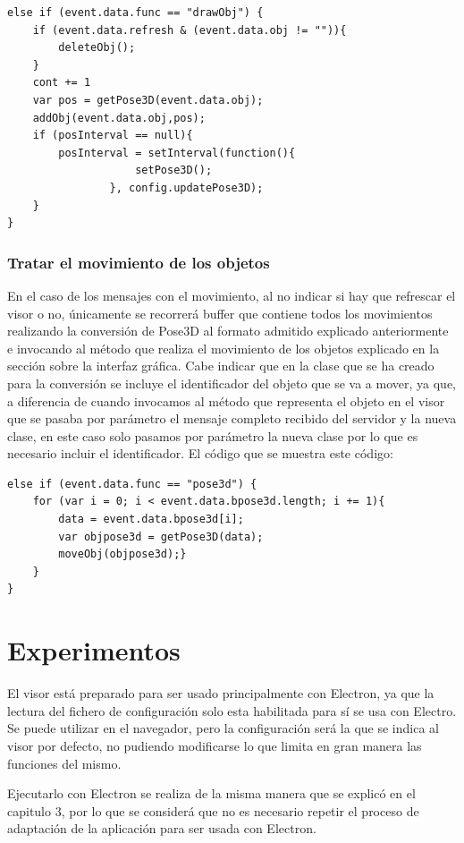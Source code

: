 \begin{lstlisting}[frame=single]
else if (event.data.func == "drawObj") {
	if (event.data.refresh & (event.data.obj != "")){
		deleteObj();
	}
	cont += 1
	var pos = getPose3D(event.data.obj);
	addObj(event.data.obj,pos);
	if (posInterval == null){ 
		posInterval = setInterval(function(){
					setPose3D();
				}, config.updatePose3D);
	}
}
\end{lstlisting}

\subsubsection{Tratar el movimiento de los objetos}
En el caso de los mensajes con el movimiento, al no indicar si hay que refrescar el visor o no, únicamente se recorrerá buffer que contiene todos los movimientos realizando la conversión de Pose3D al formato admitido explicado anteriormente e invocando al método que realiza el movimiento de los objetos explicado en la sección sobre la interfaz gráfica. Cabe indicar que en la clase que se ha creado para la conversión se incluye el identificador del objeto que se va a mover, ya que, a diferencia de cuando invocamos al método que representa el objeto en el visor que se pasaba por parámetro el mensaje completo recibido del servidor y la nueva clase, en este caso solo pasamos por parámetro la nueva clase por lo que es necesario incluir el identificador. El código que se muestra este código:

\begin{lstlisting}[frame=single]
else if (event.data.func == "pose3d") {
	for (var i = 0; i < event.data.bpose3d.length; i += 1){
		data = event.data.bpose3d[i];
		var objpose3d = getPose3D(data);
		moveObj(objpose3d);}
	}
}
\end{lstlisting}

\section{Experimentos}
El visor está preparado para ser usado principalmente con Electron, ya que la lectura del fichero de configuración solo esta habilitada para sí se usa con Electro. Se puede utilizar en el navegador, pero la configuración será la que se indica al visor por defecto, no pudiendo modificarse lo que limita en gran manera las funciones del mismo.

Ejecutarlo con Electron se realiza de la misma manera que se explicó en el capitulo 3, por lo que se considerá que no es necesario repetir el proceso de adaptación de la aplicación para ser usada con Electron.

